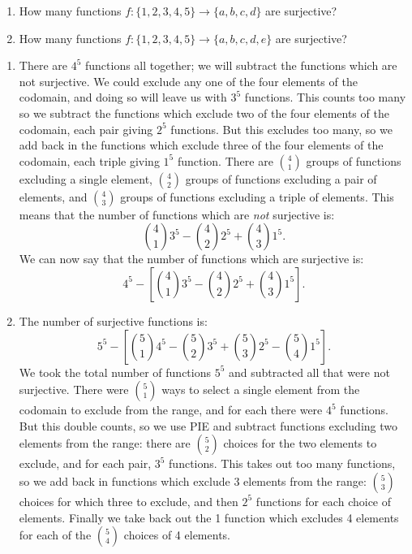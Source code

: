 \documentclass[12pt]{article}
\begin{document}
\begin{example}
  \begin{enumerate}
    \item How many functions $f: \{1,2,3,4,5\} \to \{a,b,c,d\}$ are surjective?
    \item How many functions $f: \{1,2,3,4,5\} \to \{a,b,c,d,e\}$ are surjective?
  \end{enumerate}
\begin{solution}
  \begin{enumerate}
    \item There are $4^5$ functions all together; we will subtract the functions which are not surjective.  We could exclude any one of the four elements of the codomain, and doing so will leave us with $3^5$ functions.  This counts too many so we subtract the functions which exclude two of the four elements of the codomain, each pair giving $2^5$ functions.  But this excludes too many, so we add back in the functions which exclude three of the four elements of the codomain, each triple giving $1^5$ function.  There are ${4 \choose 1}$ groups of functions excluding a single element, ${4 \choose 2}$ groups of functions excluding a pair of elements, and ${4 \choose 3}$ groups of functions excluding a triple of elements.  This means that the number of functions which are {\em not} surjective is:
    \[{4 \choose 1}3^5 - {4 \choose 2}2^5 + {4 \choose 3}1^5.\]
    We can now say that the number of functions which are surjective is:
    \[4^5 - \left[{4 \choose 1}3^5 - {4 \choose 2}2^5 + {4 \choose 3}1^5\right].\]
    
    \item The number of surjective functions is:
    \[5^5 - \left[{5 \choose 1}4^5 - {5 \choose 2}3^5 + {5 \choose 3}2^5 - {5 \choose 4}1^5\right].\]
    We took the total number of functions $5^5$ and subtracted all that were not surjective.  There were ${5 \choose 1}$ ways to select a single element from the codomain to exclude from the range, and for each there were $4^5$ functions.  But this double counts, so we use PIE and subtract functions excluding two elements from the range: there are ${5 \choose 2}$ choices for the two elements to exclude, and for each pair, $3^5$ functions.  This takes out too many functions, so we add back in functions which exclude 3 elements from the range: ${5 \choose 3}$ choices for which three to exclude, and then $2^5$ functions for each choice of elements.  Finally we take back out the 1 function which excludes 4 elements for each of the ${5 \choose 4}$ choices of 4 elements.
  \end{enumerate}

\end{solution}

\end{example}
\end{document}

